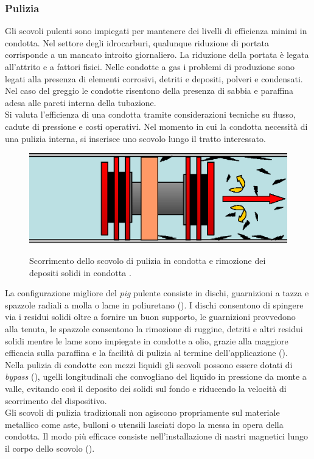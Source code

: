 \subsubsection{Pulizia}
Gli scovoli pulenti sono impiegati per mantenere dei livelli di efficienza minimi in condotta. Nel settore degli idrocarburi, qualunque riduzione di portata corrisponde a un mancato introito giornaliero. La riduzione della portata è legata all'attrito e a fattori fisici. Nelle condotte a gas i problemi di produzione sono legati alla presenza di elementi corrosivi, detriti e depositi, polveri e condensati. Nel caso del greggio le condotte risentono della presenza di sabbia e paraffina adesa alle pareti interna della tubazione.\\
Si valuta l'efficienza di una condotta tramite considerazioni tecniche su flusso, cadute di pressione e costi operativi. Nel momento in cui la condotta necessità di una pulizia interna, si inserisce uno scovolo lungo il tratto interessato.\\
\begin{figure}[htbp]
	\centering
	\includegraphics[width=.7\textwidth]{fig/pig/cleaning.eps}
	\label{fig:cleaningpig}
	\caption{Scorrimento dello scovolo di pulizia in condotta e rimozione dei depositi solidi in condotta \parencite{davidson2002introduction}.}
\end{figure}
La configurazione migliore del \textit{pig} pulente consiste in dischi, guarnizioni a tazza e spazzole radiali a molla o lame in poliuretano (). I dischi consentono di spingere via i residui solidi oltre a fornire un buon supporto, le guarnizioni provvedono alla tenuta, le spazzole consentono la rimozione di ruggine, detriti e altri residui solidi mentre le lame sono impiegate in condotte a olio, grazie alla maggiore efficacia sulla paraffina e la facilità di pulizia al termine dell'applicazione (). \\
Nella pulizia di condotte con mezzi liquidi gli scovoli possono essere dotati di \textit{bypass} (), ugelli longitudinali che convogliano del liquido in pressione da monte a valle, evitando così il deposito dei solidi sul fondo e riducendo la velocità di scorrimento del dispositivo.\\
Gli scovoli di pulizia tradizionali non agiscono propriamente sul materiale metallico come aste, bulloni o utensili lasciati dopo la messa in opera della condotta. Il modo più efficace consiste nell'installazione di nastri magnetici lungo il corpo dello scovolo (). 

